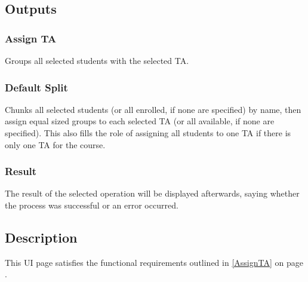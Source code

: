\documentclass{article}
\begin{document}
\subsection{Outputs}
\subsubsection{Assign TA}
Groups all selected students with the selected TA.
\subsubsection{Default Split}
Chunks all selected students (or all enrolled, if none are specified) by name, then assign equal sized groups to each selected TA (or all available, if none are specified).  This also fills the role of assigning all students to one TA if there is only one TA for the course.
\subsubsection{Result}
The result of the selected operation will be displayed afterwards, saying whether the process was successful or an error occurred.
\subsection{Description}
This UI page satisfies the functional requirements outlined in \ref{AssignTA} on page \pageref{AssignTA}.
\end{document}
